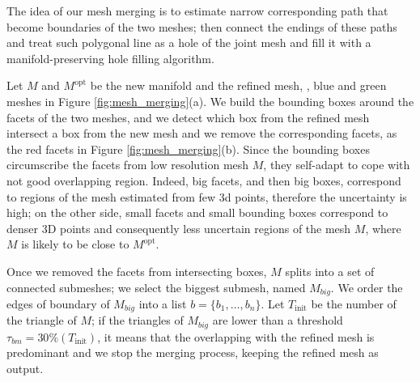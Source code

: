 \documentclass[times,10pt,twocolumn]{article}
\begin{document}
The idea of our mesh merging is to estimate narrow corresponding path that become boundaries of the two meshes; then connect the endings of these paths and treat such polygonal line as a hole of the joint mesh and fill it with a manifold-preserving hole filling algorithm.




Let $\mathit{M}$ and  $\mathit{M}^{\text{opt}}$ be the new manifold and the refined mesh, \eg, blue and green meshes in Figure \ref{fig:mesh_merging}(a). 
We build the bounding boxes around the facets of the two meshes, and we detect which box from the refined mesh intersect a box from the new mesh and we remove the corresponding facets, as the red facets in Figure \ref{fig:mesh_merging}(b).
Since the bounding boxes circumscribe the facets from low resolution mesh $\mathit{M}$, they self-adapt to cope with not good overlapping region.
Indeed, big facets, and then big boxes, correspond to regions of the mesh estimated from few 3d points, therefore the uncertainty is high; on the other side, small facets and small bounding boxes correspond to denser 3D points and consequently less uncertain regions of the mesh $\mathit{M}$, where $\mathit{M}$ is likely to be close to $\mathit{M}^{\text{opt}}$.


Once we removed the facets from intersecting boxes, $\mathit{M}$ splits into a set of connected submeshes; we select the biggest submesh, named  $\mathit{{M}_{big}}$.
We order the edges of boundary of $\mathit{{M}_{big}}$ into a list $\mathit{b} = \{b_1, \dots,  b_n\}$.
Let $T_{\text{init}}$ be the number of the triangle of  $\mathit{M}$; if the triangles of $\mathit{{M}_{big}}$ are lower than a threshold $\tau_{bm}=30\% (T_{\text{init}})$, it means that the overlapping with the refined mesh is predominant and we stop the merging process, keeping the refined mesh as output.
\end{document}
